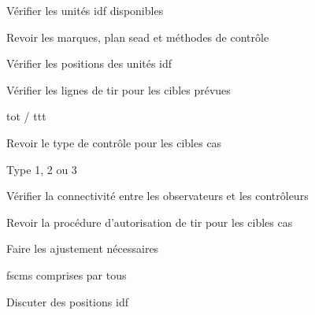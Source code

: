 \begin{e1}
\begin{e2}
\begin{e3}
\begin{e4}
				\item Vérifier les unités \gls{idf} disponibles
				\item Revoir les marques, plan \gls{sead} et méthodes de contrôle
				\item Vérifier les positions des unités \gls{idf}
				\item Vérifier les lignes de tir pour les cibles prévues
			\end{e4}
			\item \gls{tot} / \gls{ttt}
			\item Revoir le type de contrôle pour les cibles \gls{cas}
			\begin{e4}
				\item Type 1, 2 ou 3
				\item Vérifier la connectivité entre les observateurs et les contrôleurs
				\item Revoir la procédure d'autorisation de tir pour les cibles \gls{cas}
			\end{e4}
			\item Faire les ajustement nécessaires
			\item \glspl{fscm} comprises par tous
			\item Discuter des positions \gls{idf}
		\end{e3}
	\end{e2}
\end{e1}